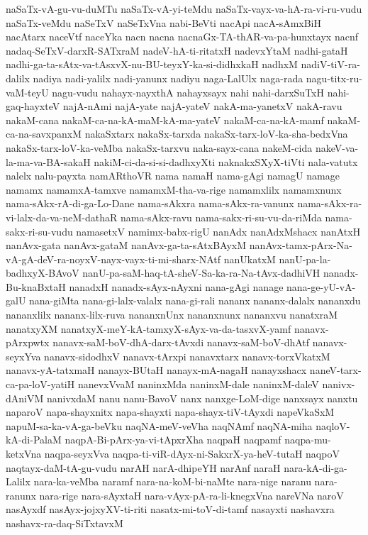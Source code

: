 {naSaTx-vA-gu-vu-duMTu
naSaTx-vA-yi-teMdu
naSaTx-vayx-va-hA-ra-vi-ru-vudu
naSaTx-veMdu
naSeTxV
naSeTxVna
nabi-BeVti
nacApi
nacA-sAmxBiH
nacAtarx
naceVtf
naceYka
nacn
nacna
nacnaGx-TA-thAR-va-pa-hunxtayx
nacnf
nadaq-SeTxV-darxR-SATxraM
nadeV-hA-ti-ritatxH
nadevxYtaM
nadhi-gataH
nadhi-ga-ta-sAtx-va-tAsxvX-nu-BU-teyxY-ka-si-didhxkaH
nadhxM
nadiV-tiV-ra-dalilx
nadiya
nadi-yalilx
nadi-yanunx
nadiyu
naga-LalUlx
naga-rada
nagu-titx-ru-vaM-teyU
nagu-vudu
nahayx-nayxthA
nahayxsayx
nahi
nahi-darxSuTxH
nahi-gaq-hayxteV
najA-nAmi
najA-yate
najA-yateV
nakA-ma-yanetxV
nakA-ravu
nakaM-cana
nakaM-ca-na-kA-maM-kA-ma-yateV
nakaM-ca-na-kA-mamf
nakaM-ca-na-savxpanxM
nakaSxtarx
nakaSx-tarxda
nakaSx-tarx-loV-ka-sha-bedxVna
nakaSx-tarx-loV-ka-veMba
nakaSx-tarxvu
naka-sayx-cana
nakeM-cida
nakeV-va-la-ma-va-BA-sakaH
nakiM-ci-da-si-si-dadhxyXti
naknakxSXyX-tiVti
nala-vatutx
nalelx
nalu-payxta
namARthoVR
nama
namaH
nama-gAgi
namagU
namage
namamx
namamxA-tamxve
namamxM-tha-va-rige
namamxlilx
namamxnunx
nama-sAkx-rA-di-ga-Lo-Dane
nama-sAkxra
nama-sAkx-ra-vanunx
nama-sAkx-ra-vi-lalx-da-va-neM-dathaR
nama-sAkx-ravu
nama-sakx-ri-su-vu-da-riMda
nama-sakx-ri-su-vudu
namasetxV
namimx-babx-rigU
nanAdx
nanAdxMshacx
nanAtxH
nanAvx-gata
nanAvx-gataM
nanAvx-ga-ta-sAtxBAyxM
nanAvx-tamx-pArx-Na-vA-gA-deV-ra-noyxV-nayx-vayx-ti-mi-sharx-NAtf
nanUkatxM
nanU-pa-la-badhxyX-BAvoV
nanU-pa-saM-haq-tA-sheV-Sa-ka-ra-Na-tAvx-dadhiVH
nanadx-Bu-knaBxtaH
nanadxH
nanadx-sAyx-nAyxni
nana-gAgi
nanage
nana-ge-yU-vA-galU
nana-giMta
nana-gi-lalx-valalx
nana-gi-rali
nananx
nananx-dalalx
nananxdu
nananxlilx
nananx-lilx-ruva
nananxnUnx
nananxnunx
nananxvu
nanatxraM
nanatxyXM
nanatxyX-meY-kA-tamxyX-sAyx-va-da-tasxvX-yamf
nanavx-pArxpwtx
nanavx-saM-boV-dhA-darx-tAvxdi
nanavx-saM-boV-dhAtf
nanavx-seyxYva
nanavx-sidodhxV
nanavx-tArxpi
nanavxtarx
nanavx-torxVkatxM
nanavx-yA-tatxmaH
nanayx-BUtaH
nanayx-mA-nagaH
nanayxshacx
naneV-tarx-ca-pa-loV-yatiH
nanevxVvaM
naninxMda
naninxM-dale
naninxM-daleV
nanivx-dAniVM
nanivxdaM
nanu
nanu-BavoV
nanx
nanxge-LoM-dige
nanxsayx
nanxtu
naparoV
napa-shayxnitx
napa-shayxti
napa-shayx-tiV-tAyxdi
napeVkaSxM
napuM-sa-ka-vA-ga-beVku
naqNA-meV-veVha
naqNAmf
naqNA-miha
naqloV-kA-di-PalaM
naqpA-Bi-pArx-ya-vi-tApxrXha
naqpaH
naqpamf
naqpa-mu-ketxVna
naqpa-seyxVva
naqpa-ti-viR-dAyx-ni-SakxrX-ya-heV-tutaH
naqpoV
naqtayx-daM-tA-gu-vudu
narAH
narA-dhipeYH
narAnf
naraH
nara-kA-di-ga-Lalilx
nara-ka-veMba
naramf
nara-na-koM-bi-naMte
nara-nige
naranu
nara-ranunx
nara-rige
nara-sAyxtaH
nara-vAyx-pA-ra-li-knegxVna
nareVNa
naroV
nasAyxdf
nasAyx-jojxyXV-ti-riti
nasatx-mi-toV-di-tamf
nasayxti
nashavxra
nashavx-ra-daq-SiTxtavxM
}
